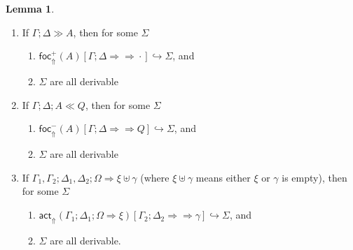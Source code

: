 \documentclass{article}
\theoremstyle{definition}
\newtheorem{lemma}{Lemma}
\newcommand{\bneuseqsymb}{
  \mathrel{\Longrightarrow\!\!\!\!\!\!\!\!\Longrightarrow}}
\newcommand{\bneuseq}[3]{#1 ; #2 \bneuseqsymb #3}
\newcommand{\brfrel}[1]{\textsf{foc}^+_{\Uparrow}(#1)}
\newcommand{\blfrel}[1]{\textsf{foc}^-_{\Uparrow}(#1)}
\newcommand{\bactrel}[1]{\textsf{act}_{\Uparrow}(#1)}
\newcommand{\relj}[3]{#1 [#2] \hookrightarrow #3}
\newcommand{\blfrelj}[3]{\relj{\blfrel{#1}}{#2}{#3}}
\newcommand{\bactrelj}[3]{\relj{\bactrel{#1}}{#2}{#3}}
\newcommand{\btriseq}[4]{#1; #2; #3 \Longrightarrow #4}
\newcommand{\rfocseq}[3]{#1; #2 \gg #3}
\newcommand{\lfocseq}[4]{#1; #2; #3 \ll #4}
\begin{document}
\begin{lemma}\label{completeness-lemma}
  \begin{enumerate}
    
  \item If $\rfocseq{\Gamma}{\Delta}{A}$, then for some $\Sigma$
    \begin{enumerate}
    \item $\relj{\brfrel{A}}{\bneuseq{\Gamma}{\Delta}{\cdot}}{\Sigma}$, and
    \item $\Sigma$ are all derivable
    \end{enumerate}
    
  \item If $\lfocseq{\Gamma}{\Delta}{A}{Q}$, then for some $\Sigma$
    \begin{enumerate}
    \item $\blfrelj{A}{\bneuseq{\Gamma}{\Delta}{Q}}{\Sigma}$, and
    \item $\Sigma$ are all derivable
    \end{enumerate}
    
  \item If $\btriseq{\Gamma_1, \Gamma_2}{\Delta_1, \Delta_2}{\Omega}{\xi \uplus
      \gamma}$ (where $\xi \uplus \gamma$ means either $\xi$ or $\gamma$ is
    empty), then for some $\Sigma$
    \begin{enumerate}
    \item
      $\bactrelj{\btriseq{\Gamma_1}{\Delta_1}{\Omega}{\xi}}{\bneuseq{\Gamma_2}{\Delta_2}{\gamma}}{\Sigma}$,
      and
    \item $\Sigma$ are all derivable.
    \end{enumerate}
  \end{enumerate}
\end{lemma}
\end{document}
